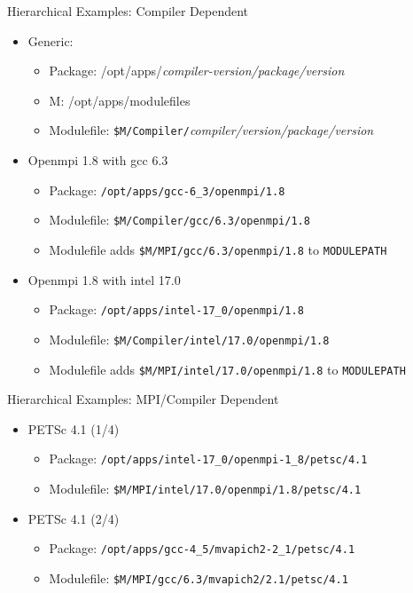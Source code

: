 \documentclass{beamer}
\begin{document}
\begin{frame}{Hierarchical Examples: Compiler Dependent}
  \begin{itemize}
    \item Generic:
      \begin{itemize}
        \item Package: /opt/apps/\emph{compiler-version/package/version}
        \item M: {\color{blue}/opt/apps/modulefiles}
        \item Modulefile: \texttt{{\color{blue}\$M}/Compiler/}\emph{compiler/version/package/version}
      \end{itemize}
    \item Openmpi 1.8 with gcc 6.3
      \begin{itemize}
        \item Package: \texttt{/opt/apps/gcc-6\_3/openmpi/1.8}
        \item Modulefile: \texttt{{\color{blue}\$M}/Compiler/gcc/6.3/openmpi/1.8}
        \item Modulefile adds \texttt{{\color{blue}\$M}/MPI/gcc/6.3/openmpi/1.8}
          to \texttt{MODULEPATH} \\
      \end{itemize}
    \item Openmpi 1.8 with intel 17.0
      \begin{itemize}
        \item Package: \texttt{/opt/apps/intel-17\_0/openmpi/1.8}
        \item Modulefile: \texttt{{\color{blue}\$M}/Compiler/intel/17.0/openmpi/1.8}
        \item Modulefile adds \texttt{\$M/MPI/intel/17.0/openmpi/1.8}
          to \texttt{MODULEPATH}
      \end{itemize}
  \end{itemize}
\end{frame}

\begin{frame}{Hierarchical Examples: MPI/Compiler Dependent}
  \begin{itemize}
    \item PETSc 4.1 (1/4)
      \begin{itemize}
        \item Package: \texttt{/opt/apps/intel-17\_0/openmpi-1\_8/petsc/4.1}
        \item Modulefile: \texttt{{\color{blue}\$M}/MPI/intel/17.0/openmpi/1.8/petsc/4.1}
      \end{itemize}
    \item PETSc 4.1 (2/4)
      \begin{itemize}
        \item Package: \texttt{/opt/apps/gcc-4\_5/mvapich2-2\_1/petsc/4.1}
        \item Modulefile: \texttt{{\color{blue}\$M}/MPI/gcc/6.3/mvapich2/2.1/petsc/4.1}
      \end{itemize}
  \end{itemize}
\end{frame}
\end{document}
